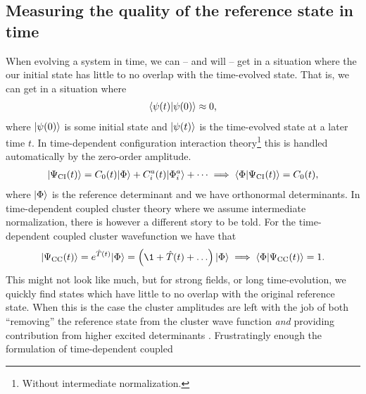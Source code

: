         \subsection{Measuring the quality of the reference state in time}
            When evolving a system in time, we can -- and will -- get in a
            situation where the our initial state has little to no overlap with
            the time-evolved state.
            That is, we can get in a situation where
            \begin{align}
                \langle \psi(t) | \psi(0) \rangle \approx 0,
            \end{align}
            where $| \psi(0) \rangle$ is some initial state and $| \psi(t) \rangle$ is
            the time-evolved state at a later time $t$.
            In time-dependent configuration interaction theory\footnote{
                Without intermediate normalization.
            } this is handled automatically by the
            zero-order amplitude.
            \begin{gather}
                | \Psi_{\text{CI}}(t) \rangle = C_0(t)| \Phi \rangle + C^{a}_{i}(t)| \Phi^{a}_{i} \rangle + \dots
                \implies \langle \Phi | \Psi_{\text{CI}}(t) \rangle = C_0(t),
            \end{gather}
            where $| \Phi \rangle$ is the reference determinant and we have
            orthonormal determinants.
            In time-dependent coupled cluster theory where we assume
            intermediate normalization, there is however a different story to be
            told.
            For the time-dependent coupled cluster wavefunction we have that
            \begin{gather}
                \ket{\cc(t)} = e^{\clust(t)}\ketslat
                = \para{
                    \1
                    + \clust(t)
                    + \dots
                }\ketslat
                \implies
                \braket{\slat}{\cc(t)} = 1.
            \end{gather}
            This might not look like much, but for strong fields, or long
            time-evolution, we quickly find states which have little to no
            overlap with the original reference state.
            When this is the case the cluster amplitudes are left with the job
            of both ``removing'' the reference state from the cluster wave
            function \emph{and} providing contribution from higher excited
            determinants \cite{pedersen2018symplectic}.
            Frustratingly enough the formulation of time-dependent coupled
